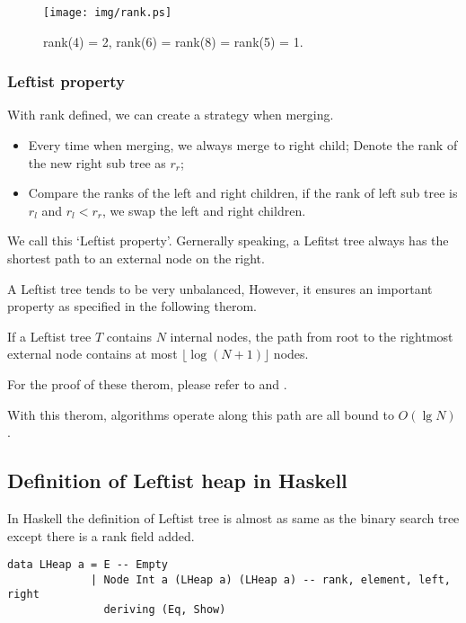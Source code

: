 \documentclass{article}
\begin{document}
\begin{figure}[htbp]
   \begin{center}
     \texttt{[image: img/rank.ps]}
     \caption{rank(4) = 2, rank(6) = rank(8) = rank(5) = 1.} \label{fig:rank}
   \end{center}
\end{figure}

\subsubsection{Leftist property}

With rank defined, we can create a strategy when merging.

\begin{itemize}
\item Every time when merging, we always merge to right child; Denote the rank
of the new right sub tree as $r_r$;
\item Compare the ranks of the left and right children, if the rank of 
left sub tree is $r_l$ and $r_l < r_r$, we swap the left and right children.
\end{itemize}

We call this `Leftist property'. Gernerally speaking, a Lefitst tree always
has the shortest path to an external node on the right.

A Leftist tree tends to be very unbalanced, However, it ensures an important
property as specified in the following therom.

If a Leftist tree $T$ contains $N$ internal nodes, the path from root to the
rightmost external node contains at most $\lfloor \log{(N+1)} \rfloor$ nodes.

For the proof of these therom, please refer to \cite{brono-book} and \cite{TAOCP}.

With this therom, algorithms operate along this path are all bound to $O(\lg N)$.

\subsection*{Definition of Leftist heap in Haskell}

In Haskell the definition of Leftist tree is almost as same as the
binary search tree except there is a rank field added.

\lstset{language=Haskell}
\begin{lstlisting}
data LHeap a = E -- Empty 
             | Node Int a (LHeap a) (LHeap a) -- rank, element, left, right
               deriving (Eq, Show)
\end{lstlisting}
\end{document}
